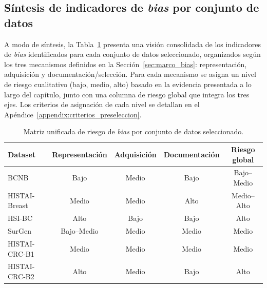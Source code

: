 \subsection{Síntesis de indicadores de \textit{bias} por conjunto de datos}
\label{sec:sintesis_bias}

A modo de síntesis, la Tabla~\ref{tab:matriz_riesgo_unificada} presenta una visión consolidada de los indicadores de \textit{bias} identificados para cada conjunto de datos seleccionado, organizados según los tres mecanismos definidos en la Sección~\ref{sec:marco_bias}: representación, adquisición y documentación/selección. Para cada mecanismo se asigna un nivel de riesgo cualitativo (bajo, medio, alto) basado en la evidencia presentada a lo largo del capítulo, junto con una columna de riesgo global que integra los tres ejes. Los criterios de asignación de cada nivel se detallan en el Apéndice~\ref{appendix:criterios_preseleccion}.

\begin{table}[htbp]
\centering
\caption{Matriz unificada de riesgo de \textit{bias} por conjunto de datos seleccionado.}
\label{tab:matriz_riesgo_unificada}
\small
\setlength{\tabcolsep}{5pt}
\begin{tabular}{lcccc}
\toprule
\textbf{Dataset} &
  \textbf{Representación} &
  \textbf{Adquisición} &
  \textbf{Documentación} &
  \textbf{Riesgo global} \\
\midrule
BCNB &
  \cellcolor{riesgobajo}Bajo &
  \cellcolor{riesgomedio}Medio &
  \cellcolor{riesgobajo}Bajo &
  \cellcolor{riesgobajo}Bajo--Medio \\
HISTAI-Breast &
  \cellcolor{riesgomedio}Medio &
  \cellcolor{riesgomedio}Medio &
  \cellcolor{riesgoalto}Alto &
  \cellcolor{riesgomedio}Medio--Alto \\
HSI-BC &
  \cellcolor{riesgoalto}Alto &
  \cellcolor{riesgobajo}Bajo &
  \cellcolor{riesgobajo}Bajo &
  \cellcolor{riesgoalto}Alto \\
SurGen &
  \cellcolor{riesgobajo}Bajo--Medio &
  \cellcolor{riesgomedio}Medio &
  \cellcolor{riesgomedio}Medio &
  \cellcolor{riesgomedio}Medio \\
HISTAI-CRC-B1 &
  \cellcolor{riesgomedio}Medio &
  \cellcolor{riesgomedio}Medio &
  \cellcolor{riesgomedio}Medio &
  \cellcolor{riesgomedio}Medio \\
HISTAI-CRC-B2 &
  \cellcolor{riesgoalto}Alto &
  \cellcolor{riesgomedio}Medio &
  \cellcolor{riesgobajo}Bajo &
  \cellcolor{riesgoalto}Alto \\
\bottomrule
\end{tabular}
\end{table}


